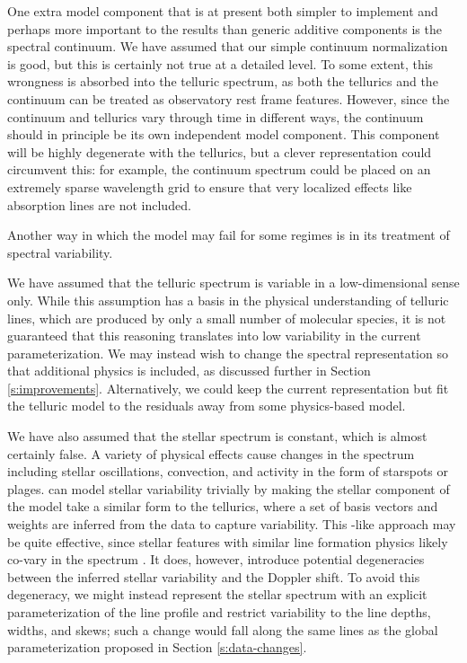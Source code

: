 \documentclass[modern]{aastex62}
\begin{document}
One extra model component that is at present both simpler to implement and perhaps more important to the results than generic additive components is the spectral continuum. 
We have assumed that our simple continuum normalization is good, but this is certainly not true at a detailed level. 
To some extent, this wrongness is absorbed into the telluric spectrum, as both the tellurics and the continuum can be treated as observatory rest frame features. 
However, since the continuum and tellurics vary through time in different ways, the continuum should in principle be its own independent model component. 
This component will be highly degenerate with the tellurics, but a clever representation could circumvent this: for example, the continuum spectrum could be placed on an extremely sparse wavelength grid to ensure that very localized effects like absorption lines are not included.

Another way in which the \wobble model may fail for some regimes is in its treatment of spectral variability.

We have assumed that the telluric spectrum is variable in a low-dimensional sense only. 
While this assumption has a basis in the physical understanding of telluric lines, which are produced by only a small number of molecular species, it is not guaranteed that this reasoning translates into low variability in the current parameterization. 
We may instead wish to change the spectral representation so that additional physics is included, as discussed further in Section \ref{s:improvements}. 
Alternatively, we could keep the current representation but fit the telluric model to the residuals away from some physics-based model. 

We have also assumed that the stellar spectrum is constant, which is almost certainly false. 
A variety of physical effects cause changes in the spectrum including stellar oscillations, convection, and activity in the form of starspots or plages. 
\wobble can model stellar variability trivially by making the stellar component of the model take a similar form to the tellurics, where a set of basis vectors and weights are inferred from the data to capture variability. 
This \PCA-like approach may be quite effective, since stellar features with similar line formation physics likely co-vary in the spectrum \citep{Davis2017, Dumusque2018}. 
It does, however, introduce potential degeneracies between the inferred stellar variability and the Doppler shift. 
To avoid this degeneracy, we might instead represent the stellar spectrum with an explicit parameterization of the line profile and restrict variability to the line depths, widths, and skews; such a change would fall along the same lines as the global \LSF parameterization proposed in Section \ref{s:data-changes}.
\end{document}

